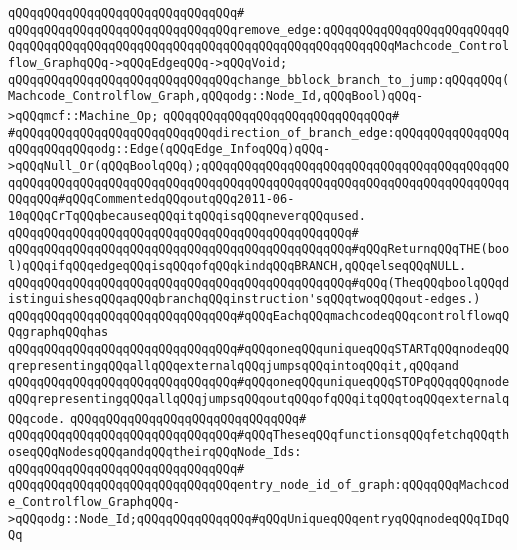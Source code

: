 \verb|qQQqqQQqqQQqqQQqqQQqqQQqqQQqqQQq#|\newline
\verb|qQQqqQQqqQQqqQQqqQQqqQQqqQQqqQQqremove_edge:qQQqqQQqqQQqqQQqqQQqqQQqqQQqqQQqqQQqqQQqqQQqqQQqqQQqqQQqqQQqqQQqqQQqqQQqqQQqqQQqMachcode_Controlflow_GraphqQQq->qQQqEdgeqQQq->qQQqVoid;|\newline
\verb|qQQqqQQqqQQqqQQqqQQqqQQqqQQqqQQqchange_bblock_branch_to_jump:qQQqqQQq(Machcode_Controlflow_Graph,qQQqodg::Node_Id,qQQqBool)qQQq->qQQqmcf::Machine_Op;|\newline
\verb|qQQqqQQqqQQqqQQqqQQqqQQqqQQqqQQq#|\newline
\verb|#qQQqqQQqqQQqqQQqqQQqqQQqqQQqdirection_of_branch_edge:qQQqqQQqqQQqqQQqqQQqqQQqqQQqodg::Edge(qQQqEdge_InfoqQQq)qQQq->qQQqNull_Or(qQQqBoolqQQq);qQQqqQQqqQQqqQQqqQQqqQQqqQQqqQQqqQQqqQQqqQQqqQQqqQQqqQQqqQQqqQQqqQQqqQQqqQQqqQQqqQQqqQQqqQQqqQQqqQQqqQQqqQQqqQQqqQQqqQQq#qQQqCommentedqQQqoutqQQq2011-06-10qQQqCrTqQQqbecauseqQQqitqQQqisqQQqneverqQQqused.|\newline
\verb|qQQqqQQqqQQqqQQqqQQqqQQqqQQqqQQqqQQqqQQqqQQqqQQq#|\newline
\verb|qQQqqQQqqQQqqQQqqQQqqQQqqQQqqQQqqQQqqQQqqQQqqQQq#qQQqReturnqQQqTHE(bool)qQQqifqQQqedgeqQQqisqQQqofqQQqkindqQQqBRANCH,qQQqelseqQQqNULL.|\newline
\verb|qQQqqQQqqQQqqQQqqQQqqQQqqQQqqQQqqQQqqQQqqQQqqQQq#qQQq(TheqQQqboolqQQqdistinguishesqQQqaqQQqbranchqQQqinstruction'sqQQqtwoqQQqout-edges.)|\newline
\newline
\verb|qQQqqQQqqQQqqQQqqQQqqQQqqQQqqQQq#qQQqEachqQQqmachcodeqQQqcontrolflowqQQqgraphqQQqhas|\newline
\verb|qQQqqQQqqQQqqQQqqQQqqQQqqQQqqQQq#qQQqoneqQQquniqueqQQqSTARTqQQqnodeqQQqrepresentingqQQqallqQQqexternalqQQqjumpsqQQqintoqQQqit,qQQqand|\newline
\verb|qQQqqQQqqQQqqQQqqQQqqQQqqQQqqQQq#qQQqoneqQQquniqueqQQqSTOPqQQqqQQqnodeqQQqrepresentingqQQqallqQQqjumpsqQQqoutqQQqofqQQqitqQQqtoqQQqexternalqQQqcode.|\newline
\verb|qQQqqQQqqQQqqQQqqQQqqQQqqQQqqQQq#|\newline
\verb|qQQqqQQqqQQqqQQqqQQqqQQqqQQqqQQq#qQQqTheseqQQqfunctionsqQQqfetchqQQqthoseqQQqNodesqQQqandqQQqtheirqQQqNode_Ids:|\newline
\verb|qQQqqQQqqQQqqQQqqQQqqQQqqQQqqQQq#|\newline
\verb|qQQqqQQqqQQqqQQqqQQqqQQqqQQqqQQqentry_node_id_of_graph:qQQqqQQqMachcode_Controlflow_GraphqQQq->qQQqodg::Node_Id;qQQqqQQqqQQqqQQq#qQQqUniqueqQQqentryqQQqnodeqQQqIDqQQq|\newline
